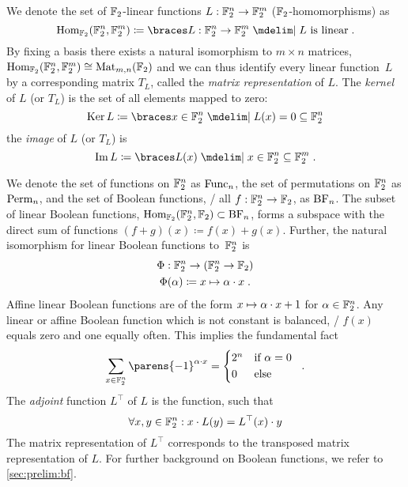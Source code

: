 We denote the set of $\mathbb{F}_2$-linear functions $L : \mathbb{F}_2^n \to \mathbb{F}_2^m$ ($\mathbb{F}_2$-homo\-mor\-phisms) as
\begin{equation*}
    \mathrm{Hom}_{\F_2}(\F_2^n, \F_2^m) \coloneqq \set{L : \F_2^n \to \F_2^m \given L\ \text{is linear}}\;.
\end{equation*}
By fixing a basis there exists a natural isomorphism to $m \times n$ matrices, $\mathrm{Hom}_{\mathbb{F}_2}(\mathbb{F}_2^n, \mathbb{F}_2^m) \cong \mathrm{Mat}_{m,n}(\mathbb{F}_2)$ and we can thus identify every linear function~$L$ by a corresponding matrix $T_L$, called the \emph{matrix representation} of $L$.
The \emph{kernel} of $L$ (or $T_L$) is the set of all elements mapped to zero:
\begin{equation*}
    \Ker{L} \coloneqq \set{x \in \F_2^n \given L(x) = 0} \subseteq \F_2^n
\end{equation*}
the \emph{image} of $L$ (or $T_L$) is
\begin{equation*}
    \Im{L} \coloneqq \set{L(x) \given x \in \F_2^n} \subseteq \F_2^m\;.
\end{equation*}

We denote the set of functions on $\mathbb{F}_2^n$ as $\func/_n$, the set of permutations on $\mathbb{F}_2^n$ as $\perm/_n$, and the set of Boolean functions, \ie/ all $f : \mathbb{F}_2^n \to \mathbb{F}_2$, as $\boolfunc/_n$.
The subset of linear Boolean functions, $\mathrm{Hom}_{\F_2}(\F_2^n, \F_2) \subset \boolfunc/_n$, forms a subspace with the direct sum of functions $(f + g)(x) \coloneqq f(x) + g(x)$.
Further, the natural isomorphism for linear Boolean functions to~$\mathbb{F}_2^n$ is
\begin{gather*}
    \Phi : \mathbb{F}_2^n \to (\mathbb{F}_2^n \to \mathbb{F}_2) \\
    \Phi(\alpha) \coloneqq x \mapsto \alpha \cdot x\;.
\end{gather*}
Affine linear Boolean functions are of the form $x \mapsto \alpha \cdot x + 1$ for $\alpha \in \mathbb{F}_2^n$.
Any linear or affine Boolean function which is not constant is balanced, \ie/ $f(x)$ equals zero and one equally often.
This implies the fundamental fact
\begin{equation}\label{eqn:sum-fact}
    \sum_{x \in \F_2^n} \parens{-1}^{\iprod{\alpha}{x}} = \begin{cases*}
        2^n & if $\alpha = 0$ \\
        0   & else
    \end{cases*}\;.
\end{equation}
The \emph{adjoint} function $L^\top$ of $L$ is the function, such that
\begin{equation}\label{eqn:adjoint}
    \forall x,y \in \mathbb{F}_2^n : x \cdot L(y) = L^\top(x) \cdot y
\end{equation}
The matrix representation of $L^\top$ corresponds to the transposed matrix representation of $L$.
For further background on Boolean functions, we refer to \cref{sec:prelim:bf}.

